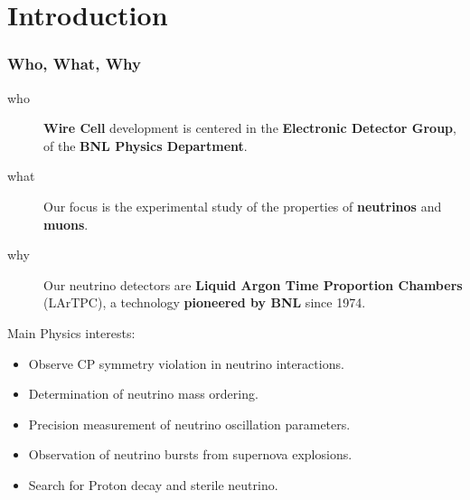 \documentclass[xcolor=dvipsnames]{beamer}
\begin{document}




\section {Introduction}

\begin{frame}
  \frametitle{Who, What, Why}

  \begin{description}
  \item[who] \textbf{Wire Cell} development is centered in the
    \textbf{Electronic Detector Group}, of the \textbf{BNL Physics
      Department}.
  \item[what] Our focus is the experimental study of the properties of
    \textbf{neutrinos} and \textbf{muons}.
  \item[why] Our neutrino detectors are \textbf{Liquid Argon Time
      Proportion Chambers} (LArTPC), a technology \textbf{pioneered by
      BNL} since 1974.
  \end{description}
  Main Physics interests:
  \begin{itemize}
  \item Observe CP symmetry violation in neutrino interactions.
  \item Determination of neutrino mass ordering.
  \item Precision measurement of neutrino oscillation parameters.
  \item Observation of neutrino bursts from supernova explosions.
  \item Search for Proton decay and sterile neutrino.
  \end{itemize}
\end{frame}
\end{document}
